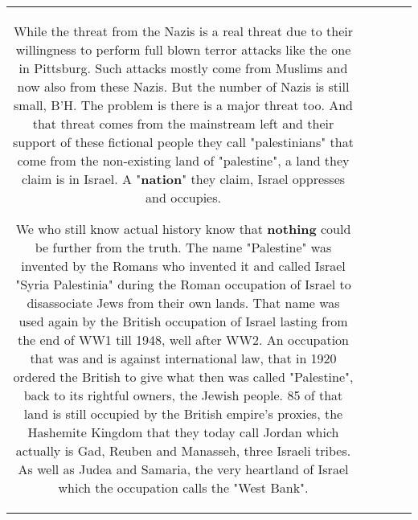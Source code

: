 \documentclass[11pt]{article}
\newlength\mylength
\begin{document}
\begin{center}
\begin{longtable}{|C{.65\mylength}|C{.30\mylength}|C{.12\mylength}|C{.12\mylength}|C{.12\mylength}|}
While the threat from the Nazis is a real threat due to their willingness to perform full blown terror attacks like the one in Pittsburg. Such attacks mostly come from Muslims and now also from these Nazis. But the number of Nazis is still small, B'H. The problem is there is a major threat too. And that threat comes from the mainstream left and their support of these fictional people they call "palestinians" that come from the non-existing land of "palestine", a land they claim is in Israel. A "\textbf{nation}" they claim, Israel oppresses and occupies.

We who still know actual history know that \textbf{nothing} could be further from the truth. The name "Palestine" was invented by the Romans who invented it and called Israel "Syria Palestinia" during the Roman occupation of Israel to disassociate Jews from their own lands. That name was used again by the British occupation of Israel lasting from the end of WW1 till 1948, well after WW2. An occupation that was and is against international law, that in 1920 ordered the British to give what then was called "Palestine", back to its rightful owners, the Jewish people. 85  of that land is still occupied by the British empire's proxies, the Hashemite Kingdom that they today call Jordan which actually is Gad, Reuben and Manasseh, three Israeli tribes. As well as Judea and Samaria, the very heartland of Israel which the occupation calls the "West Bank".


\end{longtable}
\end{center}
\end{document}
